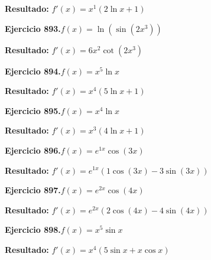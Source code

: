 \documentclass[10pt,a4paper]{article}
\begin{document}
\begin{solbox}
\textbf{Resultado:} \(\displaystyle f'(x) = x^{1}(2\ln x + 1)\)
\end{solbox}

\begin{ejbox}
\textbf{Ejercicio 893.}\quad $f(x) = \ln(\sin(2x^{3}))$
\end{ejbox}

\begin{solbox}
\textbf{Resultado:} \(\displaystyle f'(x) = 6x^{2}\cot(2x^{3})\)
\end{solbox}

\begin{ejbox}
\textbf{Ejercicio 894.}\quad $f(x) = x^{5} \ln x$
\end{ejbox}

\begin{solbox}
\textbf{Resultado:} \(\displaystyle f'(x) = x^{4}(5\ln x + 1)\)
\end{solbox}

\newpage
\begin{ejbox}
\textbf{Ejercicio 895.}\quad $f(x) = x^{4} \ln x$
\end{ejbox}

\begin{solbox}
\textbf{Resultado:} \(\displaystyle f'(x) = x^{3}(4\ln x + 1)\)
\end{solbox}

\begin{ejbox}
\textbf{Ejercicio 896.}\quad $f(x) = e^{1x} \cos(3x)$
\end{ejbox}

\begin{solbox}
\textbf{Resultado:} \(\displaystyle f'(x) = e^{1x}(1\cos(3x) - 3\sin(3x))\)
\end{solbox}

\begin{ejbox}
\textbf{Ejercicio 897.}\quad $f(x) = e^{2x} \cos(4x)$
\end{ejbox}

\begin{solbox}
\textbf{Resultado:} \(\displaystyle f'(x) = e^{2x}(2\cos(4x) - 4\sin(4x))\)
\end{solbox}

\newpage
\begin{ejbox}
\textbf{Ejercicio 898.}\quad $f(x) = x^{5} \sin x$
\end{ejbox}

\begin{solbox}
\textbf{Resultado:} \(\displaystyle f'(x) = x^{4}(5\sin x + x\cos x)\)
\end{solbox}
\end{document}
